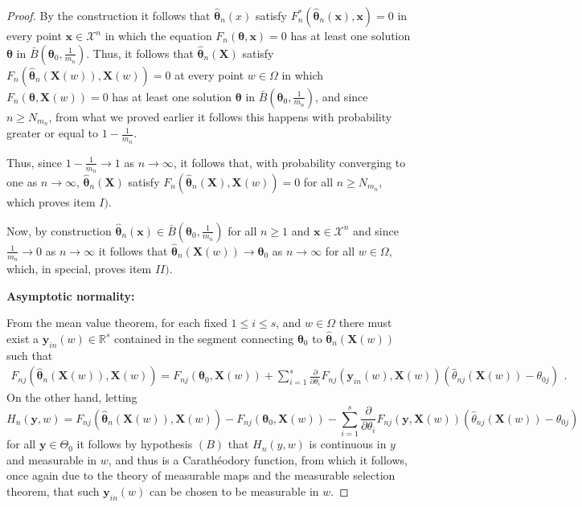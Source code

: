\documentclass[12pt]{article} %
\newcommand{\bs}{\boldsymbol}
\theoremstyle{definition}
\begin{document}
\begin{proof}
By the construction it follows that
$\bs{\hat{\theta}}_n(x)$ satisfy $F^*_n(\bs{\hat{\theta}}_n(\bs{x}),\bs{x})=0$ in every point $\bs{x}\in \mathcal{X}^n$ in which the equation $F_n(\bs{\theta},\bs{x})=0$ has at least one solution $\bs{\theta}$ in $\bar{B}\left(\bs{\theta}_0,\frac{1}{m_n}\right)$.
Thus, it follows that $\bs{\hat{\theta}}_n(\bs{X})$ satisfy $F_n(\bs{\hat{\theta}}_n(\bs{X}(w)),\bs{X}(w))=0$ at every point $w\in \Omega$ in which $F_n(\bs{\theta},\bs{X}(w))=0$ has at least one solution $\bs{\theta}$ in $\bar{B}\left(\bs{\theta}_0,\frac{1}{m_n}\right)$, and since $n\geq N_{m_n}$, from what we proved earlier it follows this happens with probability greater or equal to $1-\frac{1}{m_n}$. 

Thus, since $1-\frac{1}{m_n}\to 1$ as $n\to \infty$, it follows that, with probability converging to one as $n\to \infty$, $\hat{\bs{\theta}}_n(\bs{X})$ satisfy $F_n\left(\bs{\hat{\theta}}_n(\bs{X}),\bs{X}(w)\right)=0$ for all $n\geq N_{m_n}$, which proves item $I)$.

Now, by construction $\bs{\hat{\theta}}_n(\bs{x})\in \bar{B}\left(\bs{\theta}_0,\frac{1}{m_n}\right)$ for all $n\geq 1$ and $\bs{x}\in \mathcal{X}^n$ and since $\frac{1}{m_n}\to 0$ as $n\to \infty$ it follows that $\bs{\hat{\theta}}_n(\bs{X}(w)) \to \bs{\theta}_0$ as $n\to \infty$ for all $w\in \Omega$, which, in special, proves item $II)$.

\noindent\textbf{Asymptotic normality:}
\vspace{0.3cm}

From the mean value theorem, for each fixed $1\leq i\leq s$, and $w\in \Omega$ there must exist a $\bs{y}_{in}(w) \in \mathbb{R}^s$ contained in the segment connecting $\bs{\theta}_0$ to $\bs{\hat{\theta}}_n(\bs{X}(w))$ such that
\begin{equation}\label{eqF_n}
\begin{aligned}
F_{nj}(\bs{\hat{\theta}}_n(\bs{X}(w)),\bs{X}(w)) = F_{nj}(\bs{\theta}_0,\bs{X}(w)) + \sum_{i=1}^s  \frac{\partial}{\partial \theta_i} F_{nj}(\bs{y}_{in}(w),\bs{X}(w)) (\hat{\theta}_{nj}(\bs{X}(w)) - \theta_{0j})
\end{aligned}.
\end{equation}
On the other hand, letting
\begin{equation*}H_n(\bs{y},w) = F_{nj}(\bs{\hat{\theta}}_n(\bs{X}(w)),\bs{X}(w)) - F_{nj}(\bs{\theta}_0,\bs{X}(w)) - \sum_{i=1}^s  \frac{\partial}{\partial \theta_i} F_{nj}(\bs{y},\bs{X}(w)) (\hat{\theta}_{nj}(\bs{X}(w)) - \theta_{0j})
\end{equation*}
for all $\bs{y}\in \Theta_0$
it follows by hypothesis $(B)$ that $H_n(y,w)$ is continuous in $y$ and measurable in $w$, and thus is a Carathéodory function,
from which it follows, once again due to the theory of measurable maps and the measurable selection theorem, that such $\bs{y}_{in}(w)$ can be chosen to be measurable in $w$.


\end{proof}
\end{document}
